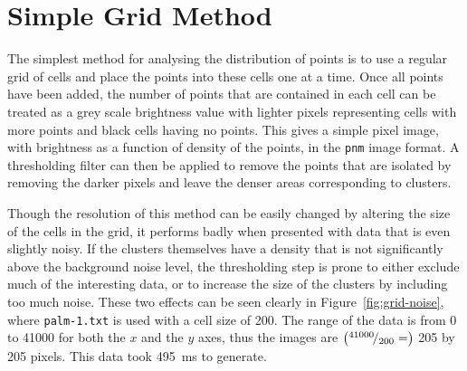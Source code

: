 
\section{Simple Grid Method}
\label{sec:simple_grid_method}

The simplest method for analysing the distribution of points is to use a
regular grid of cells and place the points into these cells one at a time. Once
all points have been added, the number of points that are contained in each
cell can be treated as a grey scale brightness value with lighter pixels
representing cells with more points and black cells having no points. This
gives a simple pixel image, with brightness as a function of density of the
points, in the \texttt{pnm} image format\cite{murray1996encyclopedia}. A
thresholding filter can then be applied to remove the points that are isolated
by removing the darker pixels and leave the denser areas corresponding to
clusters.

Though the resolution of this method can be easily changed by altering the size
of the cells in the grid, it performs badly when presented with data that is
even slightly noisy. If the clusters themselves have a density that is not
significantly above the background noise level, the thresholding step is prone
to either exclude much of the interesting data, or to increase the size of the
clusters by including too much noise. These two effects can be seen clearly in
Figure~\ref{fig:grid-noise}, where \texttt{palm-1.txt} is used with a cell size
of 200. The range of the data is from 0 to \num{41000} for both the $x$ and the
$y$ axes, thus the images are $\left({}^{41000}\!/_{200} = \right)$ 205 by 205
pixels. This data took \SI{495}{\milli\second} to generate.

